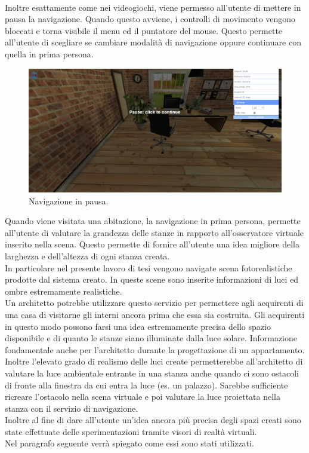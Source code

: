 \\
Inoltre esattamente come nei videogiochi, viene permesso all’utente di mettere in pausa la navigazione.
Quando questo avviene, i controlli di movimento vengono bloccati e torna visibile il menu ed il puntatore del mouse. Questo permette all’utente di scegliare se cambiare modalità di navigazione  oppure continuare con quella in prima persona.
\begin{figure}[htb]
 \centering
 \includegraphics[width=1\linewidth]{images/chapter_navigazione_scena/navigator_pause.png}\hfill
 \caption[Navigazione in pausa.]{Navigazione in pausa.}
 \label{fig:navigazione_scena_navigator_pause}
\end{figure}
\newpage
Quando viene visitata una abitazione, la navigazione in prima persona, permette all’utente di valutare la grandezza delle stanze in rapporto all’osservatore virtuale inserito nella scena. Questo permette di fornire all’utente una idea migliore della larghezza e dell’altezza di ogni stanza creata.
\\
In particolare nel presente lavoro di tesi vengono navigate scena fotorealistiche prodotte dal sistema creato. In queste scene sono inserite informazioni di luci ed ombre estremamente realistiche.
\\
Un architetto potrebbe utilizzare questo servizio per permettere agli acquirenti di una casa di visitarne gli interni ancora prima che essa sia costruita.
Gli acquirenti in questo modo possono farsi una idea estremamente precisa dello spazio disponibile e di quanto le stanze siano illuminate dalla luce solare.
Informazione fondamentale anche per l’architetto durante la progettazione di un appartamento.
\\
Inoltre l’elevato grado di realismo delle luci create permetterebbe all’architetto di valutare la luce ambientale entrante in una stanza anche quando ci sono ostacoli di fronte alla finestra da cui entra la luce (es. un palazzo). Sarebbe sufficiente ricreare l’ostacolo nella scena virtuale e poi valutare la luce proiettata nella stanza con il servizio di navigazione.
\\
Inoltre al fine di dare all’utente un’idea ancora più precisa degli spazi creati sono state effettuate delle sperimentazioni tramite visori di realtà virtuali.
\\ 
Nel paragrafo seguente verrà spiegato come essi sono stati utilizzati.

